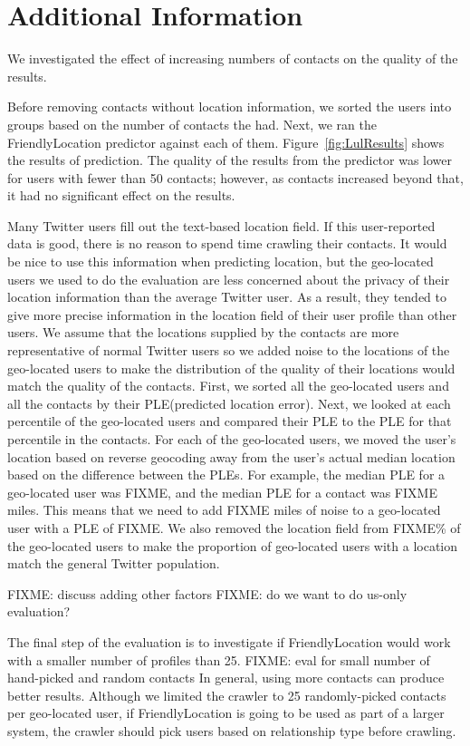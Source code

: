 \section{Additional Information}
We investigated the effect of increasing numbers of contacts on the quality of
the results.

Before removing contacts without location information, we sorted the users into
groups based on the number of contacts the had.
Next, we ran the FriendlyLocation predictor against each of them.
Figure~\ref{fig:LulResults} shows the results of prediction.
The quality of the results from the predictor was lower for users with fewer
than 50 contacts; however, as contacts increased beyond that, it had no
significant effect on the results.

\ifdefined\THESIS
    Many Twitter users fill out the text-based location field.
    If this user-reported data is good, there is no reason to spend time
    crawling their contacts.
    It would be nice to use this information when predicting location, but
    the geo-located users we used to do the evaluation are less concerned about
    the privacy of their location information than the average Twitter user.
    As a result, they tended to give more precise information in the location
    field of their user profile than other users.
    We assume that the locations supplied by the contacts are more
    representative of normal Twitter users so we added noise to the locations
    of the geo-located users to make the distribution of the quality of their
    locations would match the quality of the contacts.
    First, we sorted all the geo-located users and all the contacts by their
    PLE(predicted location error).
    Next, we looked at each percentile of the geo-located users and compared
    their PLE to the PLE for that percentile in the contacts.
    For each of the geo-located users, we moved the user's location based on
    reverse geocoding away from the user's actual median location based on the
    difference between the PLEs.
    For example, the median PLE for a geo-located user was FIXME, and the median
    PLE for a contact was FIXME miles.
    This means that we need to add FIXME miles of noise to a geo-located user
    with a PLE of FIXME.
    We also removed the location field from FIXME\% of the geo-located users to
    make the proportion of geo-located users with a location match the general
    Twitter population.
\fi

FIXME: discuss adding other factors
FIXME: do we want to do us-only evaluation?

The final step of the evaluation is to investigate if FriendlyLocation would
work with a smaller number of profiles than 25.
%
FIXME: eval for small number of hand-picked and random contacts
%
In general, using more contacts can produce better results.
%
Although we limited the crawler to 25 randomly-picked contacts per geo-located
user, if FriendlyLocation is going to be used as part of a larger system, the
crawler should pick users based on relationship type before crawling.



